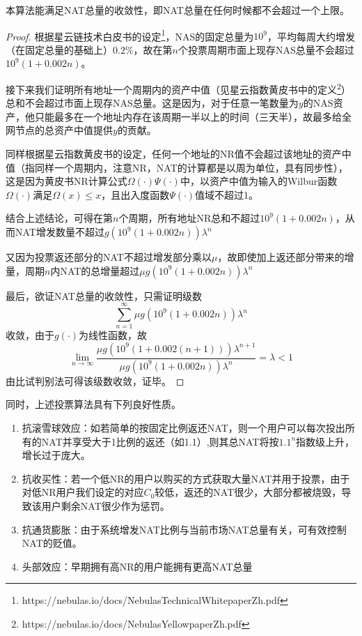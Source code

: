 \begin{property}
本算法能满足NAT总量的收敛性，即NAT总量在任何时候都不会超过一个上限。
\end{property}
\begin{proof}
	根据星云链技术白皮书的设定\footnote{https://nebulas.io/docs/NebulasTechnicalWhitepaperZh.pdf}，NAS的固定总量为$10^9$，平均每周大约增发（在固定总量的基础上）$0.2\%$，故在第$n$个投票周期市面上现存NAS总量不会超过$10^9(1+0.002n)$。
	
	接下来我们证明所有地址一个周期内的资产中值（见星云指数黄皮书中的定义\footnote{https://nebulas.io/docs/NebulasYellowpaperZh.pdf}）总和不会超过市面上现存NAS总量。这是因为，对于任意一笔数量为$y$的NAS资产，他只能最多在一个地址内存在该周期一半以上的时间（三天半），故最多给全网节点的总资产中值提供$y$的贡献。
	
	同样根据星云指数黄皮书的设定，任何一个地址的NR值不会超过该地址的资产中值（指同样一个周期内，注意NR，NAT的计算都是以周为单位，具有同步性），这是因为黄皮书NR计算公式$\Omega(\cdot)\Psi(\cdot)$中，以资产中值为输入的Wilbur函数$\Omega(\cdot)$满足$\Omega(x)\leq x$，且出入度函数$\Psi(\cdot)$值域不超过1。
	
	结合上述结论，可得在第$n$个周期，所有地址NR总和不超过$10^9(1+0.002n)$，从而NAT增发数量不超过$g(10^9(1+0.002n))\lambda^n$
	
	又因为投票返还部分的NAT不超过增发部分乘以$\mu$，故即使加上返还部分带来的增量，周期$n$内NAT的总增量超过$\mu g(10^9(1+0.002n))\lambda^n$
	
	最后，欲证NAT总量的收敛性，只需证明级数
	$$\sum_{n=1}^{\infty} \mu g(10^9(1+0.002n))\lambda^n$$
	收敛，由于$g(\cdot)$为线性函数，故
	$$ \lim_{n\rightarrow \infty} \frac{\mu g(10^9(1+0.002(n+1)))\lambda^{n+1}}{\mu g(10^9(1+0.002n))\lambda^n} = \lambda <1$$
	由比试判别法可得该级数收敛，证毕。
\end{proof}
同时，上述投票算法具有下列良好性质。
\begin{enumerate}
	\item 抗滚雪球效应：如若简单的按固定比例返还NAT，则一个用户可以每次投出所有的NAT并享受大于1比例的返还（如1.1）,则其总NAT将按$1.1^n$指数级上升，增长过于庞大。
	\item 抗收买性：若一个低NR的用户以购买的方式获取大量NAT并用于投票，由于对低NR用户我们设定的对应$C_0$较低，返还的NAT很少，大部分都被烧毁，导致该用户剩余NAT很少作为惩罚。
	\item 抗通货膨胀：由于系统增发NAT比例与当前市场NAT总量有关，可有效控制NAT的贬值。
	\item 头部效应：早期拥有高NR的用户能拥有更高NAT总量
\end{enumerate}

